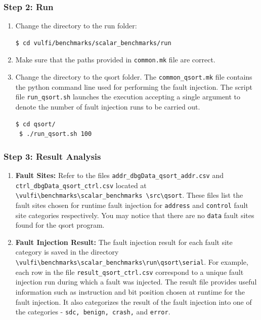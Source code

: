 \documentclass[12pt,a4paper]{article}
\begin{document}
\subsubsection{Step 2: Run}
\begin{enumerate}
 \item Change the directory to the run folder:
 \begin{Verbatim}[fontsize=\relsize{-1},frame=single,framerule=0.1mm]
 $ cd vulfi/benchmarks/scalar_benchmarks/run
 \end{Verbatim}
 \item Make sure that the paths provided in \texttt{common.mk} file
 are correct. 
 \item Change the directory to the qsort folder. The \texttt{common\_qsort.mk} file
 contains the python command line used for performing the fault injection.
 The script file \texttt{run\_qsort.sh} launches the execution accepting
 a single argument to denote the number of fault injection runs to 
 be carried out.
 
 \begin{Verbatim}[fontsize=\relsize{-1},frame=single,framerule=0.1mm]
 $ cd qsort/
 $ ./run_qsort.sh 100
 \end{Verbatim}
 \end{enumerate}
 
 \subsubsection{Step 3: Result Analysis}

 \begin{enumerate}
  \item \textbf{Fault Sites:} Refer to the files \texttt{addr\_dbgData\_qsort\_addr.csv} and \\
  \texttt{ctrl\_dbgData\_qsort\_ctrl.csv} located at \texttt{\textbackslash{vulfi}\textbackslash{benchmarks}\textbackslash{scalar\_benchmarks}
  \textbackslash{src}\textbackslash{qsort}}. These files list the fault sites chosen for runtime fault injection 
  for \texttt{address} and \texttt{control} fault site categories respectively. You may notice that there are no \texttt{data} fault 
  sites found for the qsort program.
  
  \item \textbf{Fault Injection Result:} The fault injection result for each fault site category is saved in the directory
  \texttt{\textbackslash{vulfi}\textbackslash{benchmarks}\textbackslash{scalar\_benchmarks}\textbackslash{run}\textbackslash{qsort}\textbackslash{serial}}.
  For example, each row in the file \texttt{result\_qsort\_ctrl.csv} correspond to a unique fault injection run during which a fault was injected.
  The result file provides useful information such as instruction and bit position chosen at runtime for the fault injection. It also categorizes 
  the result of the fault injection into one of the categories - \texttt{sdc, benign, crash,}  and \texttt{error}.
  
 \end{enumerate}
\end{document}

